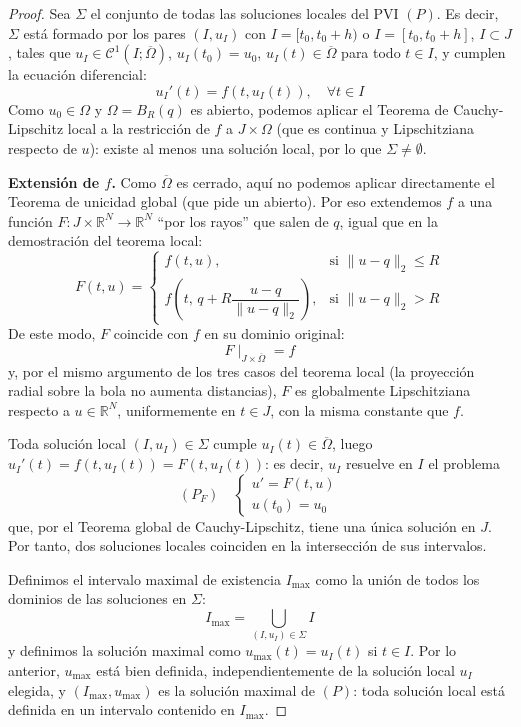 \begin{proof}
    Sea $\Sigma$ el conjunto de todas las soluciones locales del PVI $(P)$. Es decir, $\Sigma$ está formado por los pares $(I, u_I)$ con $I = [t_0, t_0 + h)$ o $I = [t_0, t_0 + h]$, $I \subset J$, tales que $u_I \in \mathcal{C}^1(I; \overline{\Omega})$, $u_I(t_0) = u_0$, $u_I(t) \in \overline{\Omega}$ para todo $t \in I$, y cumplen la ecuación diferencial:
    \[
        u_I'(t) = f(t, u_I(t)), \quad \forall t \in I
    \]
    Como $u_0 \in \Omega$ y $\Omega = B_R(q)$ es abierto, podemos aplicar el Teorema de Cauchy-Lipschitz local a la restricción de $f$ a $J \times \Omega$ (que es continua y Lipschitziana respecto de $u$): existe al menos una solución local, por lo que $\Sigma \neq \emptyset$.

    \textbf{Extensión de $f$.} Como $\overline{\Omega}$ es cerrado, aquí no podemos aplicar directamente el Teorema de unicidad global (que pide un abierto). Por eso extendemos $f$ a una función $F : J \times \mathbb{R}^N \to \mathbb{R}^N$ ``por los rayos'' que salen de $q$, igual que en la demostración del teorema local:
    \[
        F(t, u) =
        \begin{cases}
            f(t, u), & \text{si } \| u - q \|_2 \leq R \\
            f\left(t, \, q + R \dfrac{u - q}{\| u - q \|_2}\right), & \text{si } \| u - q \|_2 > R
        \end{cases}
    \]
    De este modo, $F$ coincide con $f$ en su dominio original:
    \[
        F \mid_{J \times \overline{\Omega}} = f
    \]
    y, por el mismo argumento de los tres casos del teorema local (la proyección radial sobre la bola no aumenta distancias), $F$ es globalmente Lipschitziana respecto a $u \in \mathbb{R}^N$, uniformemente en $t \in J$, con la misma constante que $f$.

    Toda solución local $(I, u_I) \in \Sigma$ cumple $u_I(t) \in \overline{\Omega}$, luego $u_I'(t) = f(t, u_I(t)) = F(t, u_I(t))$: es decir, $u_I$ resuelve en $I$ el problema
    \[
        (P_F) \quad
        \begin{cases}
            u' = F(t, u) \\
            u(t_0) = u_0
        \end{cases}
    \]
    que, por el Teorema global de Cauchy-Lipschitz, tiene una única solución en $J$. Por tanto, dos soluciones locales coinciden en la intersección de sus intervalos.

    Definimos el intervalo maximal de existencia $I_{\text{max}}$ como la unión de todos los dominios de las soluciones en $\Sigma$:
    \[
        I_{\text{max}} = \bigcup_{(I, u_I) \in \Sigma} I
    \]
    y definimos la solución maximal como $u_{\text{max}}(t) = u_I(t)$ si $t \in I$. Por lo anterior, $u_{\text{max}}$ está bien definida, independientemente de la solución local $u_I$ elegida, y $(I_{\text{max}}, u_{\text{max}})$ es la solución maximal de $(P)$: toda solución local está definida en un intervalo contenido en $I_{\text{max}}$.
    

\end{proof}
